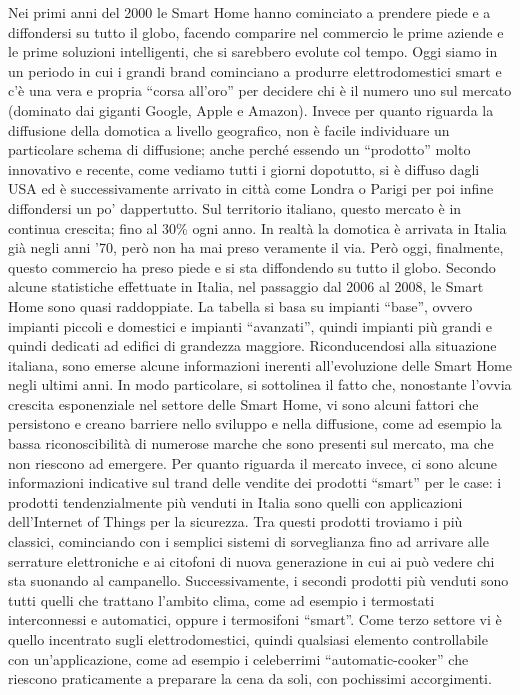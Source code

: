 Nei primi anni del 2000 le Smart Home hanno cominciato a prendere piede e a diffondersi su tutto il globo, facendo comparire nel commercio le prime aziende e le prime soluzioni intelligenti, che si sarebbero evolute col tempo.
Oggi siamo in un periodo in cui i grandi brand cominciano a produrre elettrodomestici smart e c’è una vera e propria “corsa all’oro” per decidere chi è il numero uno sul mercato (dominato dai giganti Google, Apple e Amazon). 
Invece per quanto riguarda la diffusione della domotica a livello geografico, non è facile individuare un particolare schema di diffusione; anche perché essendo un “prodotto” molto innovativo e recente, come vediamo tutti i giorni dopotutto, si è diffuso dagli USA ed è successivamente arrivato in città come Londra o Parigi per poi infine diffondersi un po’ dappertutto.
Sul territorio italiano, questo mercato è in continua crescita; fino al 30\% ogni anno. In realtà la domotica è arrivata in Italia già negli anni ’70, però non ha mai preso veramente il via. Però oggi, finalmente, questo commercio ha preso piede e si sta diffondendo su tutto il globo.
Secondo alcune statistiche  effettuate in Italia, nel passaggio dal 2006 al 2008, le Smart Home sono quasi raddoppiate. La tabella si basa su impianti “base”, ovvero impianti piccoli e domestici e impianti “avanzati”, quindi impianti più grandi e quindi dedicati ad edifici di grandezza maggiore.
Riconducendosi alla situazione italiana, sono emerse alcune informazioni inerenti all’evoluzione delle Smart Home negli ultimi anni. In modo particolare, si sottolinea il fatto che, nonostante l’ovvia crescita esponenziale nel settore delle Smart Home, vi sono alcuni fattori che persistono e creano barriere nello sviluppo e nella diffusione, come ad esempio la bassa riconoscibilità di numerose marche che sono presenti sul mercato, ma che non riescono ad emergere. 
Per quanto riguarda il mercato invece, ci sono alcune informazioni indicative sul trand delle vendite dei prodotti “smart” per le case: i prodotti tendenzialmente più venduti in Italia sono quelli con applicazioni dell’Internet of Things per la sicurezza. Tra questi prodotti troviamo i più classici, cominciando con i semplici sistemi di sorveglianza fino ad arrivare alle serrature elettroniche e ai citofoni di nuova generazione in cui ai può vedere chi sta suonando al campanello.
Successivamente, i secondi prodotti più venduti sono tutti quelli che trattano l’ambito clima, come ad esempio i termostati interconnessi e automatici, oppure i termosifoni “smart”. 
Come terzo settore vi è quello incentrato sugli elettrodomestici, quindi qualsiasi elemento controllabile con un’applicazione, come ad esempio i celeberrimi “automatic-cooker” che riescono praticamente a preparare la cena da soli, con pochissimi accorgimenti. 
